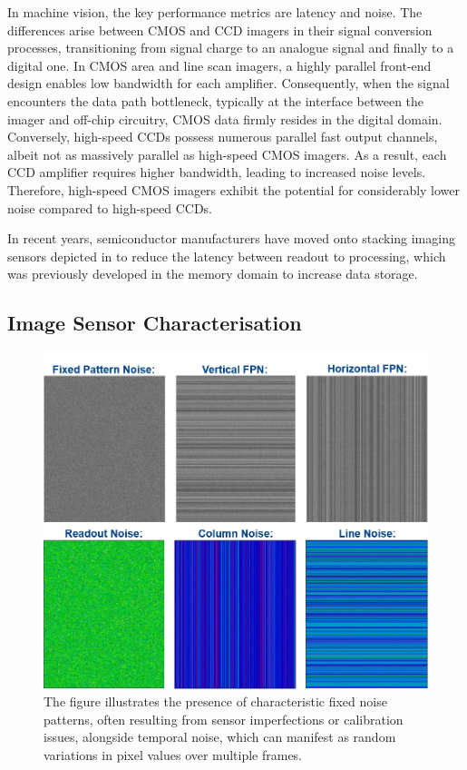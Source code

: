 In machine vision, the key performance metrics are latency and noise. The differences arise between CMOS and CCD imagers in their signal conversion processes, transitioning from signal charge to an analogue signal and finally to a digital one. In CMOS area and line scan imagers, a highly parallel front-end design enables low bandwidth for each amplifier. Consequently, when the signal encounters the data path bottleneck, typically at the interface between the imager and off-chip circuitry, CMOS data firmly resides in the digital domain. Conversely, high-speed CCDs possess numerous parallel fast output channels, albeit not as massively parallel as high-speed CMOS imagers. As a result, each CCD amplifier requires higher bandwidth, leading to increased noise levels. Therefore, high-speed CMOS imagers exhibit the potential for considerably lower noise compared to high-speed CCDs.

In recent years, semiconductor manufacturers have moved onto stacking imaging sensors depicted in  to reduce the latency between readout to processing, which was previously developed in the memory domain to increase data storage. 


\subsection{Image Sensor Characterisation}
\begin{figure}[!t]
\centering
\includegraphics[width=\linewidth]{Images/FixedPatternNoise.png}
\caption[Image Sensor Noises]{The figure illustrates the presence of characteristic fixed noise patterns, often resulting from sensor imperfections or calibration issues, alongside temporal noise, which can manifest as random variations in pixel values over multiple frames.}
\label{fig:NoiseyImage}
\end{figure} 

